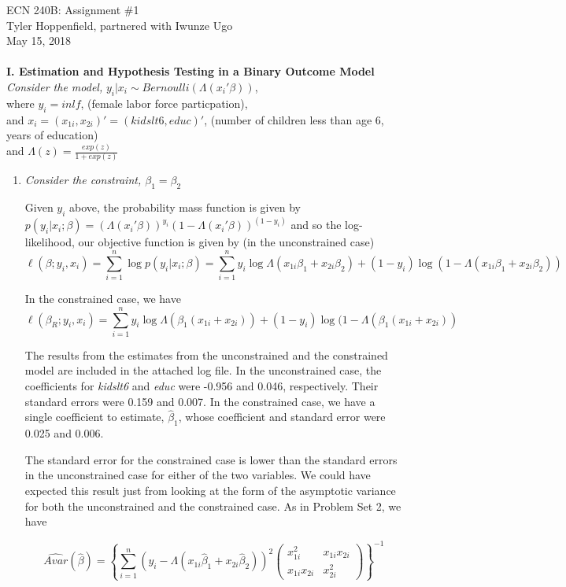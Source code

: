\documentclass{article}
\begin{document}
ECN 240B: Assignment \#1\\
Tyler Hoppenfield, partnered with Iwunze Ugo\\
May 15, 2018\\
\\
\textbf{I. Estimation and Hypothesis Testing in a Binary Outcome Model}\\

\textit{Consider the model,} $y_i|x_i \sim Bernoulli(\Lambda(x_i' \beta))$,\\
where $y_i = inlf$, (female labor force particpation),\\
and $x_i = (x_{1i}, x_{2i})' = (kidslt6, educ)'$, (number of children less than age 6, years of education)\\
and $\Lambda(z) = \frac{exp(z)}{1 + exp(z)}$

\begin{enumerate}
\item \textit{Consider the constraint, $\beta_1 = \beta_2$}

Given $y_i$ above, the probability mass function is given by $p(y_i | x_i ; \beta) = (\Lambda(x_i' \beta))^{y_i} (1 - \Lambda(x_i' \beta))^{(1 - y_i)}$ and so the log-likelihood, our objective function is given by (in the unconstrained case)
\[ \ell (\beta ; y_i, x_i) = \sum_{i = 1}^{n} \log p(y_i | x_i ; \beta) = \sum_{i=1}^{n} y_i \log \Lambda(x_{1i} \beta_1 + x_{2i} \beta_2) + (1 - y_i) \log (1 - \Lambda(x_{1i} \beta_1 + x_{2i} \beta_2)) \]

In the constrained case, we have
\[ \ell (\beta_R ; y_i, x_i) = \sum_{i=1}^{n} y_i \log \Lambda(\beta_1 (x_{1i} + x_{2i})) + (1 - y_i) \log (1 - \Lambda(\beta_1 (x_{1i} + x_{2i})) \]

The results from the estimates from the unconstrained and the constrained model are included in the attached log file. In the unconstrained case, the coefficients for \textit{kidslt6} and \textit{educ} were -0.956 and 0.046, respectively. Their standard errors were 0.159 and 0.007. In the constrained case, we have a single coefficient to estimate, $\hat{\beta}_1$, whose coefficient and standard error were 0.025 and 0.006.

The standard error for the constrained case is lower than the standard errors in the unconstrained case for either of the two variables. We could have expected this result just from looking at the form of the asymptotic variance for both the unconstrained and the constrained case. As in Problem Set 2, we have

\[ \hat{Avar} (\hat{\beta}) = \left \{ \sum_{i=1}^{n} (y_i - \Lambda (x_{1i} \hat{\beta}_1 + x_{2i} \hat{\beta}_2))^2 \begin{pmatrix} x_{1i}^2 & x_{1i} x_{2i} \\ x_{1i} x_{2i} & x_{2i}^2 \end{pmatrix} \right \}^{-1} \]


\end{enumerate}
\end{document}
